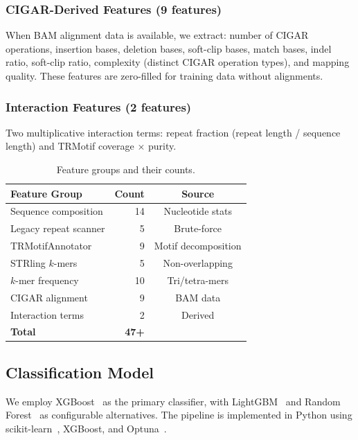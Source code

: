 \documentclass[11pt,twocolumn]{article}
\begin{document}
\subsubsection{CIGAR-Derived Features (9 features)}
When BAM alignment data is available, we extract: number of CIGAR
operations, insertion bases, deletion bases, soft-clip bases, match
bases, indel ratio, soft-clip ratio, complexity (distinct CIGAR
operation types), and mapping quality.  These features are zero-filled
for training data without alignments.

\subsubsection{Interaction Features (2 features)}
Two multiplicative interaction terms: repeat fraction (repeat length
/ sequence length) and TRMotif coverage $\times$ purity.

\begin{table}[t]
\centering
\caption{Feature groups and their counts.}
\label{tab:features}
\begin{tabular}{@{}lrc@{}}
\toprule
\textbf{Feature Group} & \textbf{Count} & \textbf{Source} \\
\midrule
Sequence composition & 14 & Nucleotide stats \\
Legacy repeat scanner & 5 & Brute-force \\
TRMotifAnnotator & 9 & Motif decomposition \\
STRling $k$-mers & 5 & Non-overlapping \\
$k$-mer frequency & 10 & Tri/tetra-mers \\
CIGAR alignment & 9 & BAM data \\
Interaction terms & 2 & Derived \\
\midrule
\textbf{Total} & \textbf{47+} & \\
\bottomrule
\end{tabular}
\end{table}

\subsection{Classification Model}\label{sec:model}

We employ XGBoost~\citep{chen2016} as the primary classifier, with
LightGBM~\citep{ke2017} and Random Forest~\citep{breiman2001} as
configurable alternatives.  The pipeline is implemented in Python using
scikit-learn~\citep{pedregosa2011}, XGBoost, and Optuna~\citep{akiba2019}.
\end{document}
